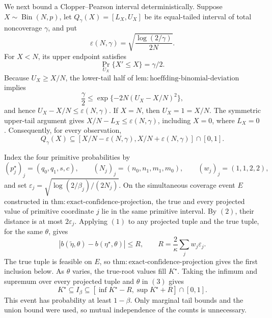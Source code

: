 We next bound a Clopper--Pearson interval deterministically. Suppose \(X\sim\operatorname{Bin}(N,p)\), let \(Q_\gamma(X)=[L_X,U_X]\) be its equal-tailed interval of total noncoverage \(\gamma\), and put
\[
\varepsilon(N,\gamma)
=\sqrt{\frac{\log(2/\gamma)}{2N}}.
\]
For \(X<N\), its upper endpoint satisfies
\[
\Pr_{U_X}\{X'\leq X\}=\gamma/2.
\]
Because \(U_X\geq X/N\), the lower-tail half of \(\mathrm{lem:hoeffding\text{-}binomial\text{-}deviation}\) implies
\[
\frac\gamma2
\leq\exp\{-2N(U_X-X/N)^2\},
\]
and hence \(U_X-X/N\leq\varepsilon(N,\gamma)\). If \(X=N\), then \(U_X=1=X/N\). The symmetric upper-tail argument gives \(X/N-L_X\leq\varepsilon(N,\gamma)\), including \(X=0\), where \(L_X=0\). Consequently, for every observation,
\[
Q_\gamma(X)
\subseteq
[X/N-\varepsilon(N,\gamma),X/N+\varepsilon(N,\gamma)]\cap[0,1].
\tag{2}
\]

Index the four primitive probabilities by
\[
(p_j^\star)_j=(q_0,q_1,s,c),
\qquad
(N_j)_j=(n_0,n_1,m_1,m_0),
\qquad
(w_j)_j=(1,1,2,2),
\]
and set \(\varepsilon_j=\sqrt{\log(2/\beta_j)/(2N_j)}\). On the simultaneous coverage event \(E\) constructed in \(\mathrm{thm:exact\text{-}confidence\text{-}projection}\), the true and every projected value of primitive coordinate \(j\) lie in the same primitive interval. By \((2)\), their distance is at most \(2\varepsilon_j\). Applying \((1)\) to any projected tuple and the true tuple, for the same \(\theta\), gives
\[
|b(\widetilde\eta,\theta)-b(\eta^\star,\theta)|
\leq R,
\qquad
R=\frac2\kappa\sum_jw_j\varepsilon_j.
\tag{3}
\]
The true tuple is feasible on \(E\), so \(\mathrm{thm:exact\text{-}confidence\text{-}projection}\) gives the first inclusion below. As \(\theta\) varies, the true-root values fill \(K^\star\). Taking the infimum and supremum over every projected tuple and \(\theta\) in \((3)\) gives
\[
K^\star\subseteq I_\beta
\subseteq[\inf K^\star-R,\sup K^\star+R]\cap[0,1].
\]
This event has probability at least \(1-\beta\). Only marginal tail bounds and the union bound were used, so mutual independence of the counts is unnecessary.

